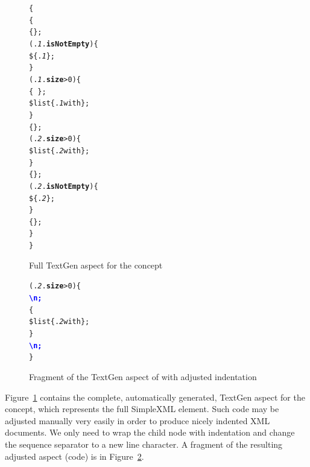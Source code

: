 \begin{figure}[ht]
\begin{alltt}
\small
{}  \{
   \{
     \{\mpstgliteral{<}\};
     (.\textit{1}.\textbf{isNotEmpty}) \{
       \$\{.\textit{1}\};
    \}
     (.\textit{1}.\textbf{size} > 0) \{
       \{\ \};
       \$list\{.\textit{1} with  \};
    \}
     \{\mpstgliteral{>}\};
     (.\textit{2}.\textbf{size} > 0) \{
       \$list\{.\textit{2} with  \};
    \}
     \{\mpstgliteral{</}\};
     (.\textit{2}.\textbf{isNotEmpty}) \{
       \$\{.\textit{2}\};
    \}
     \{\mpstgliteral{>}\};
  \}
\}
\end{alltt}
\caption{Full TextGen aspect for the  concept}
\label{fig:TEXTGENFINAL}
\end{figure}

\begin{figure}[ht]
\begin{alltt}
\small
{} (.\textit{2}.\textbf{size} > 0) \{
   \textcolor{blue}{\textbf{\textbackslash{}n;}}
   \{
     \$list\{.\textit{2} with  \};
  \}
   \textcolor{blue}{\textbf{\textbackslash{}n;}}
\} 
\end{alltt}
\caption{Fragment of the TextGen aspect of  with adjusted indentation}
\label{fig:TEXTGENADJUSTED}
\end{figure}

Figure~\ref{fig:TEXTGENFINAL} contains the complete, automatically generated, TextGen aspect for the  concept, which represents the full SimpleXML element.
Such code may be adjusted manually very easily in order to produce nicely indented XML documents.
We only need to wrap the  child node with indentation and change the sequence separator to a new line character.
A fragment of the resulting adjusted aspect (code) is in Figure~\ref{fig:TEXTGENADJUSTED}.

